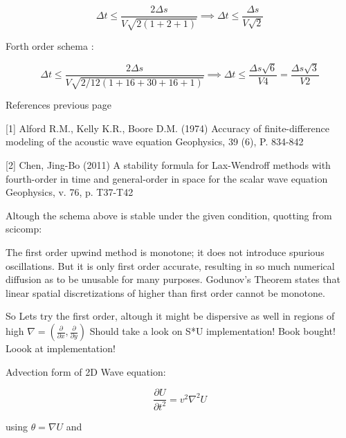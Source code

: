 \documentclass[legalpaper, 12pt]{article}
\begin{document}
$$ \Delta t \leq \frac{2 \Delta s}{ V \sqrt{2(1+2+1)}} \implies \Delta t \leq \frac{ \Delta s}{ V \sqrt{2}} $$

Forth order schema :

$$ \Delta t \leq \frac{2 \Delta s}{ V \sqrt{2/12(1+16+30+16+1)}} \implies \Delta t \leq \frac{ \Delta s \sqrt{6}}{ V 4} = \frac{ \Delta s \sqrt{3}}{ V 2}$$

\newpage

References previous page

[1] Alford R.M., Kelly K.R., Boore D.M. (1974) Accuracy of finite-difference modeling of the acoustic wave equation Geophysics, 39 (6), P. 834-842

[2] Chen, Jing-Bo (2011) A stability formula for Lax-Wendroff methods with fourth-order in time and general-order in space for the scalar wave equation Geophysics, v. 76, p. T37-T42

\newpage

Altough the schema above is stable under the given condition, quotting from scicomp:

The first order upwind method is monotone; it does not introduce spurious oscillations. But it is only first order accurate, resulting in so much numerical diffusion as to be unusable for many purposes. Godunov's Theorem states that linear spatial discretizations of higher than first order cannot be monotone.

So Lets try the first order, altough it might be dispersive as well in regions of high $ \nabla = ( \frac{\partial}{\partial x}, \frac{\partial}{\partial y} ) $ Should take a look on S*U implementation! Book bought! Loook at implementation!


\newpage


\medspace
\medspace
Advection form of 2D Wave equation:
\medspace

$$ \frac{\partial U}{\partial t ^2} = v^2 \nabla^2 U $$ 

using $\theta = \nabla U $ and 
\end{document}
